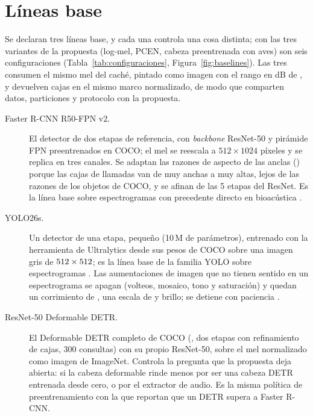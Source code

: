 \documentclass[12pt,a4paper]{article}
\begin{document}
\section{Líneas base}
\label{sec:baselines}

Se declaran tres líneas base, y cada una controla una cosa distinta; con las tres variantes
de la propuesta (log-mel, PCEN, cabeza preentrenada con aves) son seis configuraciones
(Tabla~\ref{tab:configuraciones}, Figura~\ref{fig:baselines}). Las tres consumen el mismo mel
del caché, pintado como imagen con el rango en dB de , y devuelven cajas en el
mismo marco normalizado, de modo que comparten datos, particiones y protocolo con la
propuesta.

\begin{description}
    \item[Faster R-CNN R50-FPN v2.] El detector de dos etapas de referencia, con
          \textit{backbone} ResNet-50 y pirámide FPN preentrenados en COCO; el mel se
          reescala a $512 \times 1024$ píxeles y se replica en tres canales. Se adaptan las
          razones de aspecto de las anclas (\anchorRatios{}) porque las cajas de llamadas van
          de muy anchas a muy altas, lejos de las razones de los objetos de COCO, y se afinan
          \trainableLayers{} de las 5 etapas del ResNet. Es la línea base sobre espectrogramas
          con precedente directo en bioacústica \citep{escobar-amado_computer_2024}.
    \item[YOLO26s.] Un detector de una etapa, pequeño (10\,M de parámetros), entrenado con la
          herramienta de Ultralytics desde sus pesos de COCO sobre una imagen gris de
          $512 \times 512$; es la línea base de la familia YOLO sobre
          espectrogramas \citep{gonzalez_yolo-based_2025}. Las aumentaciones de imagen que no
          tienen sentido en un espectrograma se apagan (volteos, mosaico, tono y saturación)
          y quedan un corrimiento de \yoloTranslate{}, una escala de \yoloScale{} y brillo;
          se detiene con paciencia \yoloPatience{}. 
    \item[ResNet-50 Deformable DETR.] El Deformable DETR completo de COCO
          (\code{\detrCheckpoint}, dos etapas con refinamiento de cajas, 300 consultas) con su
          propio ResNet-50, sobre el mel normalizado como imagen de ImageNet. Controla la
          pregunta que la propuesta deja abierta: si la cabeza deformable rinde menos por ser
          una cabeza DETR entrenada desde cero, o por el extractor de audio. Es la misma
          política de preentrenamiento con la que \citet{zhu_sound_2025} reportan que un DETR
          supera a Faster R-CNN.
\end{description}
\end{document}
